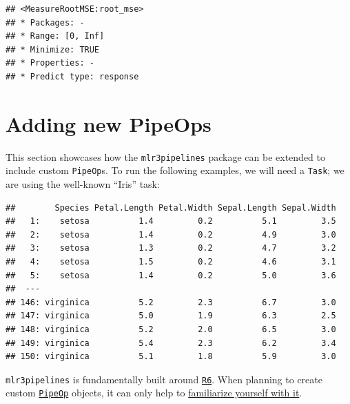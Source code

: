 \documentclass[]{scrbook}
\newenvironment{Shaded}{\begin{snugshade}}{\end{snugshade}}
\newcommand{\KeywordTok}[1]{\textcolor[rgb]{0.13,0.29,0.53}{\textbf{#1}}}
\newcommand{\NormalTok}[1]{#1}
\newcommand{\OperatorTok}[1]{\textcolor[rgb]{0.81,0.36,0.00}{\textbf{#1}}}
\newcommand{\StringTok}[1]{\textcolor[rgb]{0.31,0.60,0.02}{#1}}
\renewenvironment{Shaded} {\begin{snugshade}\small} {\end{snugshade}}
\begin{document}
\begin{verbatim}
## <MeasureRootMSE:root_mse>
## * Packages: -
## * Range: [0, Inf]
## * Minimize: TRUE
## * Properties: -
## * Predict type: response
\end{verbatim}

\hypertarget{extending-pipeops}{%
\section{Adding new PipeOps}\label{extending-pipeops}}

This section showcases how the \texttt{mlr3pipelines} package can be extended to include custom \texttt{PipeOp}s.
To run the following examples, we will need a \texttt{Task}; we are using the well-known ``Iris'' task:

\begin{Shaded}
\end{Shaded}

\begin{verbatim}
##        Species Petal.Length Petal.Width Sepal.Length Sepal.Width
##   1:    setosa          1.4         0.2          5.1         3.5
##   2:    setosa          1.4         0.2          4.9         3.0
##   3:    setosa          1.3         0.2          4.7         3.2
##   4:    setosa          1.5         0.2          4.6         3.1
##   5:    setosa          1.4         0.2          5.0         3.6
##  ---                                                            
## 146: virginica          5.2         2.3          6.7         3.0
## 147: virginica          5.0         1.9          6.3         2.5
## 148: virginica          5.2         2.0          6.5         3.0
## 149: virginica          5.4         2.3          6.2         3.4
## 150: virginica          5.1         1.8          5.9         3.0
\end{verbatim}

\texttt{mlr3pipelines} is fundamentally built around \href{https://r6.r-lib.org/}{\texttt{R6}}. When planning to create custom \href{https://mlr3pipelines.mlr-org.com/reference/PipeOp.html}{\texttt{PipeOp}} objects, it can only help to \href{https://adv-r.hadley.nz/r6.html}{familiarize yourself with it}.
\end{document}
